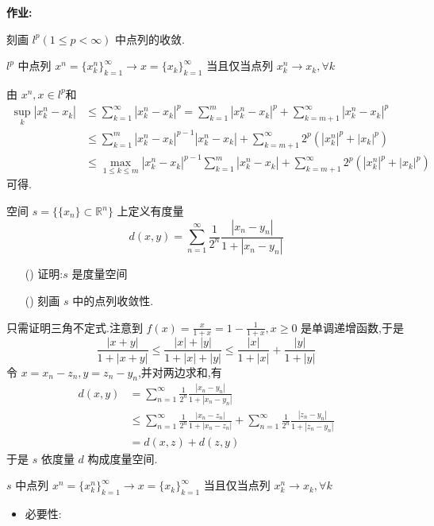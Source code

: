 \documentclass[12pt,letterpaper,boxed]{hmcpset}
\begin{document}
\begin{CJK}{UTF8}{}

\headerblock

\setlength{\parindent}{0pt}
\Large \textbf{作业:}
\large

\begin{problem}[Ex1:]
  刻画 $l^p (1\leq p < \infty )$ 中点列的收敛.
\end{problem}
\begin{solution}
  $l^p $ 中点列 $ x^n = \{x_k^n\}_{k=1}^{\infty} \to x = \{x_k\}_{k=1}^{\infty} $ 当且仅当点列 $ x^n_k \to x_k,\forall k $

  由 $x^n,x \in l^p$和
  \begin{align*}
    \sup_k |x_k^n - x_k| &\leq \sum_{k=1}^{\infty} |x_k^n - x_k |^p = \sum_{k=1}^m |x_k^n - x_k |^p + \sum_{k=m+1}^{\infty}|x_k^n - x_k |^p \\
    &\leq \sum_{k=1}^m |x_k^n - x_k |^{p-1}|x_k^n - x_k | + \sum_{k=m+1}^\infty 2^p (|x_k^n |^p +| x_k |^p)\\
    &\leq \max_{1\leq k\leq m}|x_k^n - x_k |^{p-1}\sum_{k=1}^m |x_k^n - x_k | + \sum_{k=m+1}^\infty 2^p (|x_k^n |^p +| x_k |^p)
  \end{align*}
  可得.
\end{solution}


\begin{problem}[Ex2:]
  空间 $s=\{\{x_n\}\subset \mathbb{R}^n \}$ 上定义有度量
    \[ d(x,y) = \sum_{n=1}^\infty \frac{1}{2^n} \frac{|x_n-y_n|}{1+|x_n-y_n|} \]
  \begin{itemize}
    \item[(\romannumeral1)] 证明:$s$ 是度量空间
    \item[(\romannumeral2)] 刻画 $s$ 中的点列收敛性.
  \end{itemize}
\end{problem}
\begin{solution}[(\romannumeral1)]
  只需证明三角不定式.注意到 $f(x)=\frac{x}{1+x}=1-\frac{1}{1+x},x\geq 0$ 是单调递增函数,于是
    \[
      \frac{|x+y|}{1+|x+y|}\leq \frac{|x|+|y|}{1+|x|+|y|} \leq \frac{|x|}{1+|x|} + \frac{|y|}{1+|y|}
    \]
  令 $ x = x_n-z_n,y = z_n - y_n $,并对两边求和,有
    \begin{align*}
        d(x,y) &= \sum_{n=1}^\infty \frac{1}{2^n} \frac{|x_n-y_n|}{1+|x_n-y_n|}\\
        &\leq \sum_{n=1}^\infty \frac{1}{2^n} \frac{|x_n-z_n|}{1+|x_n-z_n|}+ \sum_{n=1}^\infty \frac{1}{2^n} \frac{|z_n-y_n|}{1+|z_n-y_n|}\\
        &=d(x,z)+d(z,y)
    \end{align*}
  于是 $s$ 依度量 $d$ 构成度量空间.
\end{solution}
\begin{solution}[(\romannumeral2)]
  $s$ 中点列 $ x^n = \{x_k^n\}_{k=1}^{\infty} \to x = \{x_k\}_{k=1}^{\infty} $ 当且仅当点列 $ x^n_k \to x_k,\forall k $
  \begin{itemize}
  \item 必要性:


\end{itemize}
\end{solution}
\end{CJK}
\end{document}
